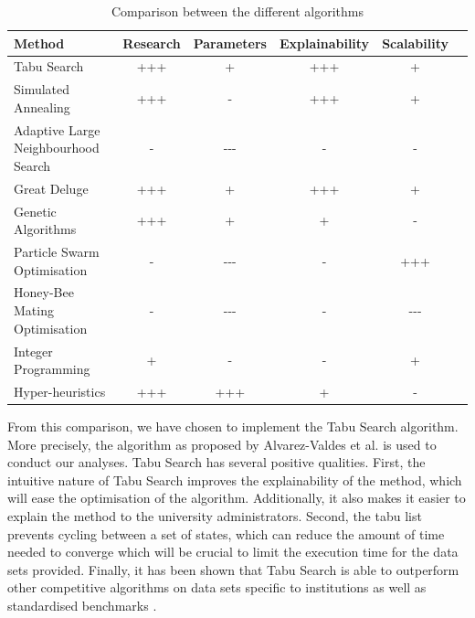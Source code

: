 \begin{table}[H]
	\caption{Comparison between the different algorithms}
	\label{tab:comparison_algos}
	\centering
	\begin{tabular}{l | c c c c c }
		\hline
		\textbf{Method}  & \textbf{Research} &\textbf{Parameters} &\textbf{Explainability}  & \textbf{Scalability}\\ \hline
		Tabu Search & +++ & + & +++ & +  \\
		Simulated Annealing & +++ & - & +++ & +  \\
	    Adaptive Large Neighbourhood Search &  - & -{}-{}- & - & -  \\
            Great Deluge & +++ & + & +++ & + \\
            Genetic Algorithms & +++& + & + & - \\ 
            Particle Swarm Optimisation & - & -{}-{}- & - & +++  \\ 
            Honey-Bee Mating Optimisation & - & -{}-{}-& - & -{}-{}- \\ 
            Integer Programming & + & - & - & +\\
            Hyper-heuristics & +++ & +++ & + & - \\
            \hline
	\end{tabular}
\end{table}
From this comparison, we have chosen to implement the Tabu Search algorithm. More precisely, the algorithm as proposed by Alvarez-Valdes et al. \cite{alvarez1997} is used to conduct our analyses. Tabu Search has several positive qualities. First, the intuitive nature of Tabu Search improves the explainability of the method, which will ease the optimisation of the algorithm. Additionally, it also makes it easier to explain the method to the university administrators. Second, the tabu list prevents cycling between a set of states, which can reduce the amount of time needed to converge which will be crucial to limit the execution time for the data sets provided. Finally, it has been shown that Tabu Search is able to outperform other competitive algorithms on data sets specific to institutions \cite{alvarez1997,colorni1999,Chu2000} as well as standardised benchmarks \cite{gaspero2001}.  